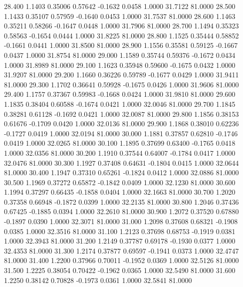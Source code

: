   28.400   1.1403   0.35006   0.57642  -0.1632   0.0458   1.0000  31.7122  81.0000
  28.500   1.1433   0.35107   0.57959  -0.1640   0.0453   1.0000  31.7537  81.0000
  28.600   1.1463   0.35211   0.58266  -0.1647   0.0448   1.0000  31.7906  81.0000
  28.700   1.1494   0.35323   0.58563  -0.1654   0.0444   1.0000  31.8225  81.0000
  28.800   1.1525   0.35444   0.58852  -0.1661   0.0441   1.0000  31.8500  81.0000
  28.900   1.1556   0.35581   0.59125  -0.1667   0.0437   1.0000  31.8754  81.0000
  29.000   1.1589   0.35744   0.59376  -0.1672   0.0434   1.0000  31.8989  81.0000
  29.100   1.1623   0.35948   0.59600  -0.1675   0.0432   1.0000  31.9207  81.0000
  29.200   1.1660   0.36226   0.59789  -0.1677   0.0429   1.0000  31.9411  81.0000
  29.300   1.1702   0.36641   0.59928  -0.1675   0.0426   1.0000  31.9606  81.0000
  29.400   1.1757   0.37367   0.59983  -0.1668   0.0424   1.0000  31.9810  81.0000
  29.600   1.1835   0.38404   0.60588  -0.1674   0.0421   1.0000  32.0046  81.0000
  29.700   1.1845   0.38281   0.61128  -0.1692   0.0421   1.0000  32.0087  81.0000
  29.800   1.1856   0.38153   0.61676  -0.1709   0.0420   1.0000  32.0136  81.0000
  29.900   1.1868   0.38010   0.62236  -0.1727   0.0419   1.0000  32.0194  81.0000
  30.000   1.1881   0.37857   0.62810  -0.1746   0.0419   1.0000  32.0265  81.0000
  30.100   1.1895   0.37699   0.63400  -0.1765   0.0418   1.0000  32.0356  81.0000
  30.200   1.1910   0.37544   0.64007  -0.1784   0.0417   1.0000  32.0476  81.0000
  30.300   1.1927   0.37408   0.64631  -0.1804   0.0415   1.0000  32.0644  81.0000
  30.400   1.1947   0.37310   0.65261  -0.1824   0.0412   1.0000  32.0886  81.0000
  30.500   1.1969   0.37272   0.65872  -0.1842   0.0409   1.0000  32.1230  81.0000
  30.600   1.1994   0.37297   0.66435  -0.1858   0.0404   1.0000  32.1663  81.0000
  30.700   1.2020   0.37358   0.66948  -0.1872   0.0399   1.0000  32.2135  81.0000
  30.800   1.2046   0.37436   0.67425  -0.1885   0.0394   1.0000  32.2610  81.0000
  30.900   1.2072   0.37520   0.67880  -0.1897   0.0390   1.0000  32.3071  81.0000
  31.000   1.2098   0.37608   0.68321  -0.1908   0.0385   1.0000  32.3516  81.0000
  31.100   1.2123   0.37698   0.68753  -0.1919   0.0381   1.0000  32.3943  81.0000
  31.200   1.2149   0.37787   0.69178  -0.1930   0.0377   1.0000  32.4353  81.0000
  31.300   1.2174   0.37877   0.69597  -0.1941   0.0373   1.0000  32.4747  81.0000
  31.400   1.2200   0.37966   0.70011  -0.1952   0.0369   1.0000  32.5126  81.0000
  31.500   1.2225   0.38054   0.70422  -0.1962   0.0365   1.0000  32.5490  81.0000
  31.600   1.2250   0.38142   0.70828  -0.1973   0.0361   1.0000  32.5841  81.0000
